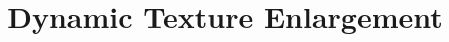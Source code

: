 

\def\adsty{./sty/} %
\def\adri{./img/}  %
\def\adrb{../BIB/}
		\def\miniframe#1#2{\hspace*{3mm}\fbox{\begin{minipage}{10.0cm}\large\textbf{#1}\\ #2\end{minipage}}}
		\def\minishadow#1#2#3{{\minibegin\titlebox{#1}#2\par #3\miniend}}
		\def\minisimple#1#2{{\minibegin #1\par #2\miniend}}
		\def\mininoshadow#1#2#3{{\minibegin\titleboxnoshadow{#1}#2\par #3\miniend}}

\documentclass[review]{\adsty acmsiggraph}      %



\usepackage{mathptmx}
\usepackage{graphicx}


\usepackage{parskip}
\usepackage{caption} %
\usepackage{subcaption}  %








\title{Dynamic Texture Enlargement}

